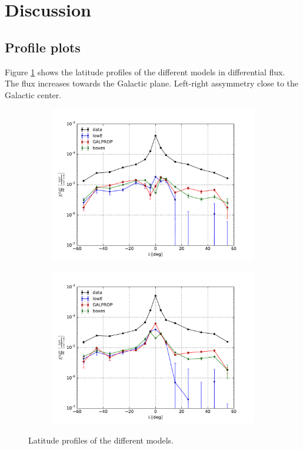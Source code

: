 \section{Discussion}


\subsection{Profile plots}

Figure \ref{Profiles_all} shows the latitude profiles of the different models in differential flux. The flux increases towards the Galactic plane. Left-right assymmetry close to the Galactic center. 


\begin{figure}[h!]
    \begin{subfigure}{0.5\textwidth}
        \includegraphics[width=\textwidth]{plots/Profiles_left.pdf}
    \end{subfigure} 
    \begin{subfigure}{0.5\textwidth}
        \includegraphics[width=\textwidth]{plots/Profiles_right.pdf}
    \end{subfigure}
  	\caption{Latitude profiles of the different models.}
  	\label{Profiles_all}
\end{figure}


